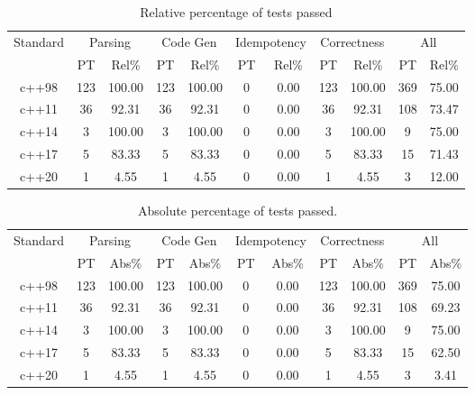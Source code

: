 \documentclass{article}
\begin{document}
\begin{table}[h]
\begin{center}
\footnotesize
\begin{tabular}{ |c|c|c|c|c|c|c|c|c|c|c| }
\multicolumn{1}{|c|}{Standard} & \multicolumn{2}{c|}{Parsing} & \multicolumn{2}{c|}{Code Gen} & \multicolumn{2}{c|}{Idempotency} & \multicolumn{2}{c|}{Correctness} & \multicolumn{2}{c|}{All} \\
  & PT & Rel\% & PT & Rel\% & PT & Rel\% & PT & Rel\% & PT & Rel\% \\
\midrule
c++98 & 123 & 100.00 & 123 & 100.00 & 0 & 0.00 & 123 & 100.00 & 369 & 75.00 \\
c++11 & 36 & 92.31 & 36 & 92.31 & 0 & 0.00 & 36 & 92.31 & 108 & 73.47 \\
c++14 & 3 & 100.00 & 3 & 100.00 & 0 & 0.00 & 3 & 100.00 & 9 & 75.00 \\
c++17 & 5 & 83.33 & 5 & 83.33 & 0 & 0.00 & 5 & 83.33 & 15 & 71.43 \\
c++20 & 1 & 4.55 & 1 & 4.55 & 0 & 0.00 & 1 & 4.55 & 3 & 12.00 \\
\end{tabular}
\end{center}
\caption{Relative percentage of tests passed}
\end{table}\begin{table}[h]
\begin{center}
\footnotesize
\begin{tabular}{ |c|c|c|c|c|c|c|c|c|c|c| }
\multicolumn{1}{|c|}{Standard} & \multicolumn{2}{c|}{Parsing} & \multicolumn{2}{c|}{Code Gen} & \multicolumn{2}{c|}{Idempotency} & \multicolumn{2}{c|}{Correctness} & \multicolumn{2}{c|}{All} \\
  & PT & Abs\% & PT & Abs\% & PT & Abs\% & PT & Abs\% & PT & Abs\% \\
\midrule
c++98 & 123 & 100.00 & 123 & 100.00 & 0 & 0.00 & 123 & 100.00 & 369 & 75.00 \\
c++11 & 36 & 92.31 & 36 & 92.31 & 0 & 0.00 & 36 & 92.31 & 108 & 69.23 \\
c++14 & 3 & 100.00 & 3 & 100.00 & 0 & 0.00 & 3 & 100.00 & 9 & 75.00 \\
c++17 & 5 & 83.33 & 5 & 83.33 & 0 & 0.00 & 5 & 83.33 & 15 & 62.50 \\
c++20 & 1 & 4.55 & 1 & 4.55 & 0 & 0.00 & 1 & 4.55 & 3 & 3.41 \\
\end{tabular}
\end{center}
\caption{Absolute percentage of tests passed.}
\end{table}\newpage
\end{document}
